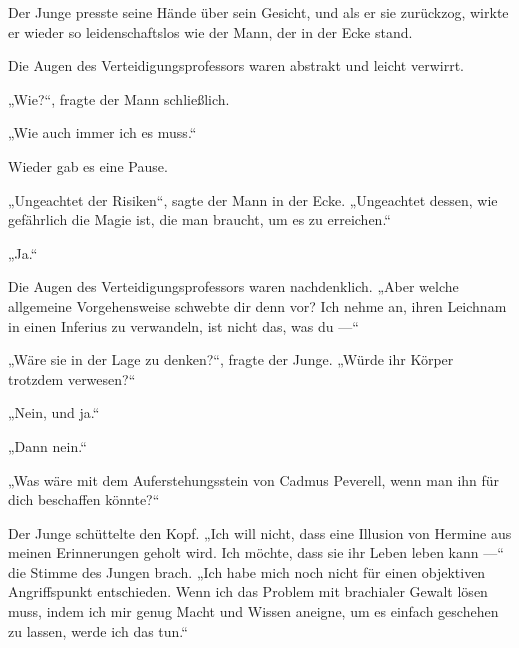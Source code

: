 Der Junge presste seine Hände über sein Gesicht, und als er sie zurückzog, wirkte er wieder so leidenschaftslos wie der Mann, der in der Ecke stand.

Die Augen des Verteidigungsprofessors waren abstrakt und leicht verwirrt.

„Wie?“, fragte der Mann schließlich.

„Wie auch immer ich es muss.“

Wieder gab es eine Pause.

„Ungeachtet der Risiken“, sagte der Mann in der Ecke.
„Ungeachtet dessen, wie gefährlich die Magie ist, die man braucht, um es zu erreichen.“

„Ja.“

Die Augen des Verteidigungsprofessors waren nachdenklich.
„Aber welche allgemeine Vorgehensweise schwebte dir denn vor? Ich nehme an, ihren Leichnam in einen Inferius zu verwandeln, ist nicht das, was du —“

„Wäre sie in der Lage zu denken?“, fragte der Junge.
„Würde ihr Körper trotzdem verwesen?“

„Nein, und ja.“

„Dann nein.“

„Was wäre mit dem Auferstehungsstein von Cadmus Peverell, wenn man ihn für dich beschaffen könnte?“

Der Junge schüttelte den Kopf.
„Ich will nicht, dass eine Illusion von Hermine aus meinen Erinnerungen geholt wird. Ich möchte, dass sie ihr Leben leben kann —“ die Stimme des Jungen brach.
„Ich habe mich noch nicht für einen objektiven Angriffspunkt entschieden. Wenn ich das Problem mit brachialer Gewalt lösen muss, indem ich mir genug Macht und Wissen aneigne, um es einfach geschehen zu lassen, werde ich das tun.“

